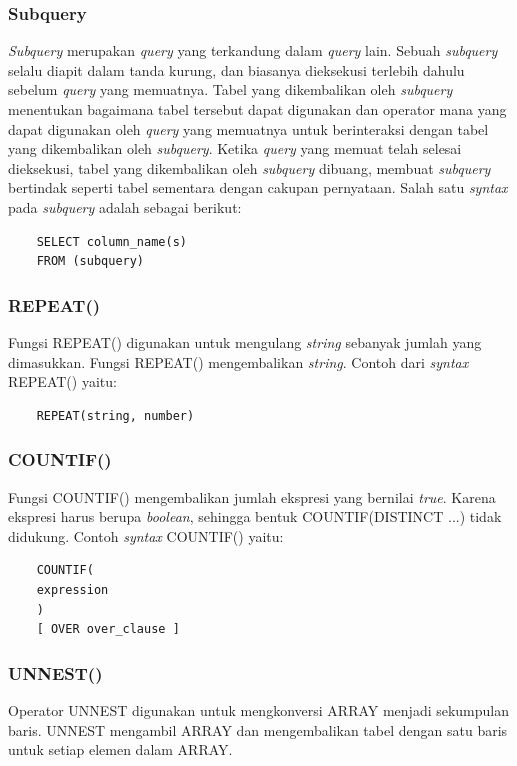 \subsubsection{Subquery}
\textit{Subquery} merupakan \textit{query} yang terkandung dalam \textit{query} lain. Sebuah \textit{subquery} selalu diapit dalam tanda kurung, dan biasanya dieksekusi terlebih dahulu sebelum \textit{query} yang memuatnya. Tabel yang dikembalikan oleh \textit{subquery} menentukan bagaimana tabel tersebut dapat digunakan dan operator mana yang dapat digunakan oleh \textit{query} yang memuatnya untuk berinteraksi dengan tabel yang dikembalikan oleh \textit{subquery}. Ketika \textit{query} yang memuat telah selesai dieksekusi, tabel yang dikembalikan oleh \textit{subquery} dibuang, membuat \textit{subquery} bertindak seperti tabel sementara dengan cakupan pernyataan. Salah satu \textit{syntax} pada \textit{subquery} adalah sebagai berikut:
\begin{verbatim}
    SELECT column_name(s)
    FROM (subquery)
\end{verbatim}

\subsubsection{REPEAT()}
Fungsi REPEAT() digunakan untuk mengulang \textit{string} sebanyak jumlah yang dimasukkan. Fungsi REPEAT() mengembalikan \textit{string}. Contoh dari \textit{syntax} REPEAT() yaitu:
\begin{verbatim}
	REPEAT(string, number)
\end{verbatim}

\subsubsection{COUNTIF()}
Fungsi COUNTIF() mengembalikan jumlah ekspresi yang bernilai \textit{true}. Karena ekspresi harus berupa \textit{boolean}, sehingga bentuk COUNTIF(DISTINCT ...) tidak didukung. Contoh \textit{syntax} COUNTIF() yaitu:
\begin{verbatim}
	COUNTIF(
	expression
	)
	[ OVER over_clause ]
\end{verbatim}

\subsubsection{UNNEST()}
Operator UNNEST digunakan untuk mengkonversi ARRAY menjadi sekumpulan baris. UNNEST mengambil ARRAY dan mengembalikan tabel dengan satu baris untuk setiap elemen dalam ARRAY. 


